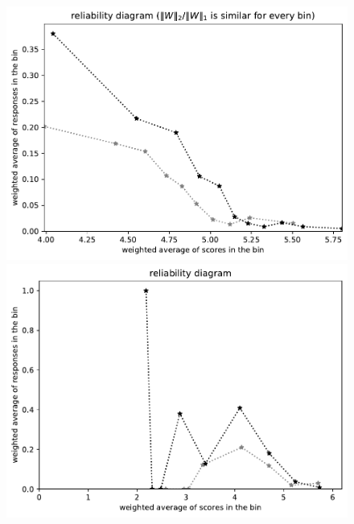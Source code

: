 \documentclass{article}
\newlength{\vertsep}
\newlength{\imsize}
\begin{document}
\begin{figure}
\begin{centering}
\parbox{\imsize}{\includegraphics[width=\imsize]
{../codes/weighted/County_of_San_Francisco_vs_San_Joaquin-LNGI/equierrs10.pdf}}
\quad\quad
\parbox{\imsize}{\includegraphics[width=\imsize]
{../codes/weighted/County_of_San_Francisco_vs_San_Joaquin-LNGI/equiscores10.pdf}}

\vspace{\vertsep}


\end{centering}
\end{figure}
\end{document}
